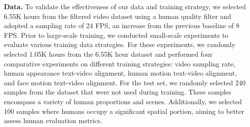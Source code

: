 \noindent\textbf{Data.}
To validate the effectiveness of our data and training strategy, we selected 6.55K hours from the filtered video dataset using a human quality filter and adopted a sampling rate of 24 FPS, an increase from the previous baseline of 8 FPS. 
Prior to large-scale training, we conducted small-scale experiments to evaluate various training data strategies. 
For these experiments, we randomly selected 1.05K hours from the 6.55K hour dataset and performed four comparative experiments on different training strategies: video sampling rate, human appearance text-video alignment, human motion text-video alignment, and face motion text-video alignment.
For the test set, we randomly selected 240 samples from the dataset that were not used during training. 
These samples encompass a variety of human proportions and scenes. Additionally, we selected 100 samples where humans occupy a significant spatial portion, aiming to better assess human evaluation metrics.

\begin{table}[t!]
\centering
{}
  \caption{Metrics used for evaluating the generated results.}
  \label{tab:metrics}
\end{table}



